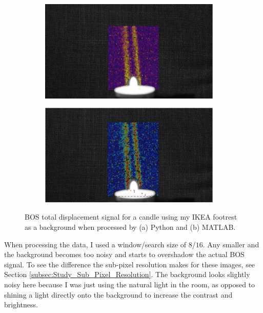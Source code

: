 \documentclass[letterpaper,12pt]{article}
\begin{document}
\begin{figure}[h]
    \centering
    \begin{subfigure}[b]{0.45\textwidth}
    	\centering
        \includegraphics[width=0.95\textwidth]{Python_Candle_Chair.PNG}
        \caption{}
        \label{fig:Python_Candle_Chair}
    \end{subfigure}
    \begin{subfigure}[b]{0.45\textwidth}
    	\centering
        \includegraphics[width=0.95\textwidth]{MATLAB_Candle_Chair.PNG}
        \caption{}
        \label{fig:MATLAB_Candle_Chair}
    \end{subfigure}

    \caption{BOS total displacement signal for a candle using my IKEA footrest as a background when processed by (a) Python and (b) MATLAB.}
    \label{fig:Candle_Chair}
\end{figure}

When processing the data, I used a window/search size of $8$/$16$.  Any smaller and the background becomes too noisy and starts to overshadow the actual BOS signal.  To see the difference the sub-pixel resolution makes for these images, see Section \ref{subsec:Study_Sub_Pixel_Resolution}.  The background looks slightly noisy here because I was just using the natural light in the room, as opposed to shining a light directly onto the background to increase the contrast and brightness.
\end{document}
